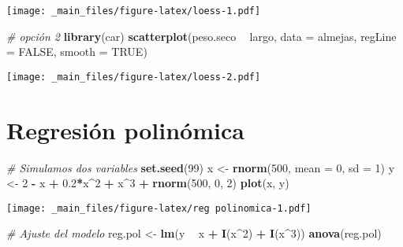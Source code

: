 \documentclass[
]{book}
\newenvironment{Shaded}{\begin{snugshade}}{\end{snugshade}}
\newcommand{\CommentTok}[1]{\textcolor[rgb]{0.56,0.35,0.01}{\textit{#1}}}
\newcommand{\DataTypeTok}[1]{\textcolor[rgb]{0.13,0.29,0.53}{#1}}
\newcommand{\DecValTok}[1]{\textcolor[rgb]{0.00,0.00,0.81}{#1}}
\newcommand{\FloatTok}[1]{\textcolor[rgb]{0.00,0.00,0.81}{#1}}
\newcommand{\KeywordTok}[1]{\textcolor[rgb]{0.13,0.29,0.53}{\textbf{#1}}}
\newcommand{\NormalTok}[1]{#1}
\newcommand{\OperatorTok}[1]{\textcolor[rgb]{0.81,0.36,0.00}{\textbf{#1}}}
\newcommand{\OtherTok}[1]{\textcolor[rgb]{0.56,0.35,0.01}{#1}}
\newcommand{\StringTok}[1]{\textcolor[rgb]{0.31,0.60,0.02}{#1}}
\begin{document}
\texttt{[image: \_main\_files/figure-latex/loess-1.pdf]}

\begin{Shaded}
\begin{Highlighting}[]
\CommentTok{# opción 2}
\KeywordTok{library}\NormalTok{(car)}
\KeywordTok{scatterplot}\NormalTok{(peso.seco }\OperatorTok{~}\StringTok{ }\NormalTok{largo, }\DataTypeTok{data =}\NormalTok{ almejas, }\DataTypeTok{regLine =} \OtherTok{FALSE}\NormalTok{, }\DataTypeTok{smooth =} \OtherTok{TRUE}\NormalTok{)}
\end{Highlighting}
\end{Shaded}

\texttt{[image: \_main\_files/figure-latex/loess-2.pdf]}

\hypertarget{regresiuxf3n-polinuxf3mica}{%
\section{Regresión polinómica}\label{regresiuxf3n-polinuxf3mica}}

\begin{Shaded}
\begin{Highlighting}[]
\CommentTok{# Simulamos dos variables}
\KeywordTok{set.seed}\NormalTok{(}\DecValTok{99}\NormalTok{)}
\NormalTok{x <-}\StringTok{ }\KeywordTok{rnorm}\NormalTok{(}\DecValTok{500}\NormalTok{, }\DataTypeTok{mean =} \DecValTok{0}\NormalTok{, }\DataTypeTok{sd =} \DecValTok{1}\NormalTok{)}
\NormalTok{y <-}\StringTok{ }\DecValTok{2} \OperatorTok{-}\StringTok{ }\NormalTok{x }\OperatorTok{+}\StringTok{ }\FloatTok{0.2}\OperatorTok{*}\NormalTok{x}\OperatorTok{^}\DecValTok{2} \OperatorTok{+}\StringTok{ }\NormalTok{x}\OperatorTok{^}\DecValTok{3} \OperatorTok{+}\StringTok{ }\KeywordTok{rnorm}\NormalTok{(}\DecValTok{500}\NormalTok{, }\DecValTok{0}\NormalTok{, }\DecValTok{2}\NormalTok{)}
\KeywordTok{plot}\NormalTok{(x, y)}
\end{Highlighting}
\end{Shaded}

\texttt{[image: \_main\_files/figure-latex/reg polinomica-1.pdf]}

\begin{Shaded}
\begin{Highlighting}[]
\CommentTok{# Ajuste del modelo}
\NormalTok{reg.pol <-}\StringTok{ }\KeywordTok{lm}\NormalTok{(y }\OperatorTok{~}\StringTok{ }\NormalTok{x }\OperatorTok{+}\StringTok{ }\KeywordTok{I}\NormalTok{(x}\OperatorTok{^}\DecValTok{2}\NormalTok{) }\OperatorTok{+}\StringTok{ }\KeywordTok{I}\NormalTok{(x}\OperatorTok{^}\DecValTok{3}\NormalTok{))}
\KeywordTok{anova}\NormalTok{(reg.pol)}
\end{Highlighting}
\end{Shaded}
\end{document}
